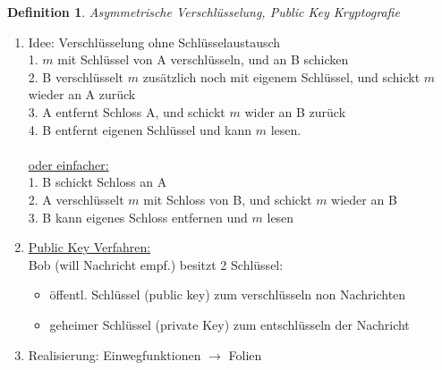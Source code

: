 \documentclass[a4paper,11pt]{article}
\newtheorem{definition}{Definition}[section]
\begin{document}
\begin{definition}
	Asymmetrische Verschlüsselung, Public Key Kryptografie
\end{definition}
\begin{enumerate}[label=\alph*)]
	\item Idee: Verschlüsselung ohne Schlüsselaustausch \\
	1. $m$ mit Schlüssel von A verschlüsseln, und an B schicken \\
	2. B verschlüsselt $m$ zusätzlich noch mit eigenem Schlüssel, und schickt $m$ wieder an A zurück \\
	3. A entfernt Schloss A, und schickt $m$ wider an B zurück \\
	4. B entfernt eigenen Schlüssel und kann $m$ lesen. \\
	\\
	\underline{oder einfacher:} \\
	1. B schickt Schloss an A \\
	2. A verschlüsselt $m$ mit Schloss von B, und schickt $m$ wieder an B \\
	3. B kann eigenes Schloss entfernen und $m$ lesen
	\item\underline{Public Key Verfahren:} \\
	Bob (will Nachricht empf.) besitzt 2 Schlüssel:
	\begin{itemize}
		\item öffentl. Schlüssel (public key) zum verschlüsseln non Nachrichten
		\item geheimer Schlüssel (private Key) zum entschlüsseln der Nachricht
	\end{itemize}
	\item Realisierung: Einwegfunktionen $\rightarrow$ Folien
	
	\newpage
	

\end{enumerate}
\end{document}

